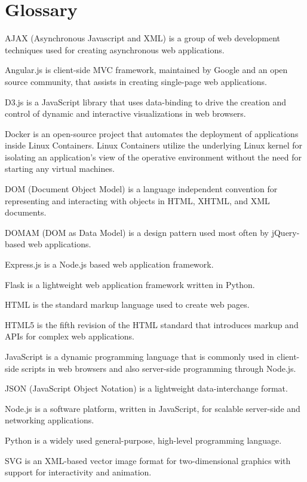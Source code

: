 \chapter*{Glossary}      %
\thispagestyle{plain}
%
\begin{glossary}
\item[AJAX] (Asynchronous Javascript and XML) is a group of web development techniques used for creating asynchronous web applications.
\item[Angular.js] is client-side MVC framework, maintained by Google and an open source community, that assists in creating single-page web applications.
\item[D3.js] is a JavaScript library that uses data-binding to drive the creation and control of dynamic and interactive visualizations in web browsers.
\item[Docker] is an open-source project that automates the deployment of applications inside Linux Containers.
  Linux Containers utilize the underlying Linux kernel for isolating an application's view of the operative environment without the need for starting any virtual machines.
\item[DOM] (Document Object Model) is a language independent convention for representing and interacting with objects in HTML, XHTML, and XML documents.
\item[DOMAM] (DOM as Data Model) is a design pattern used most often by jQuery-based web applications.
\item[Express.js] is a Node.js based web application framework.
\item[Flask] is a lightweight web application framework written in Python.
\item[HTML] is the standard markup language used to create web pages.
\item[HTML5] is the fifth revision of the HTML standard that introduces markup and APIs for complex web applications.
\item[JavaScript] is a dynamic programming language that is commonly used in client-side scripts in web browsers and also server-side programming through Node.js.
\item[JSON] (JavaScript Object Notation) is a lightweight data-interchange format.
\item[Node.js] is a software platform, written in JavaScript, for scalable server-side and networking applications.
\item[Python] is a widely used general-purpose, high-level programming language.
\item[SVG] is an XML-based vector image format for two-dimensional graphics with support for interactivity and animation.

\end{glossary}
 
